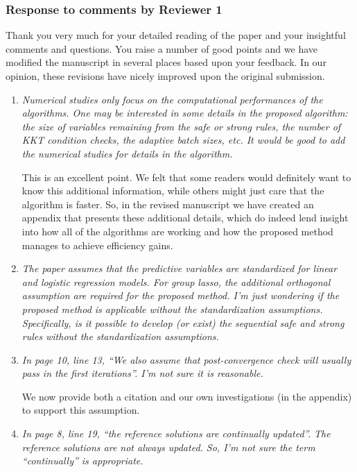 \documentclass{article}
\begin{document}
\subsubsection*{Response to comments by Reviewer 1}

Thank you very much for your detailed reading of the paper and your insightful comments and questions. You raise a number of good points and we have modified the manuscript in several places based upon your feedback.  In our opinion, these revisions have nicely improved upon the original submission.

\begin{enumerate}

\item \emph{Numerical studies only focus on the computational performances of the algorithms. One may be interested in some details in the proposed algorithm: the size of variables remaining from the safe or strong rules, the number of KKT condition checks, the adaptive batch sizes, etc. It would be good to add the numerical studies for details in the algorithm.}

  This is an excellent point. We felt that some readers would definitely want to know this additional information, while others might just care that the algorithm is faster. So, in the revised manuscript we have created an appendix that presents these additional details, which do indeed lend insight into how all of the algorithms are working and how the proposed method manages to achieve efficiency gains.

\item \emph{The paper assumes that the predictive variables are standardized for linear and logistic regression models. For group lasso, the additional orthogonal assumption are required for the proposed method. I’m just wondering if the proposed method is applicable without the standardization assumptions. Specifically, is it possible to develop (or exist) the sequential safe and strong rules without the standardization assumptions.}

\item \emph{In page 10, line 13, ``We also assume that post-convergence check will usually pass in the first iterations''. I’m not sure it is reasonable.}

  We now provide both a citation and our own investigations (in the appendix) to support this assumption.

\item \emph{In page 8, line 19, ``the reference solutions are continually updated''. The reference solutions are not always updated. So, I’m not sure the term ``continually'' is appropriate.}


\end{enumerate}
\end{document}
